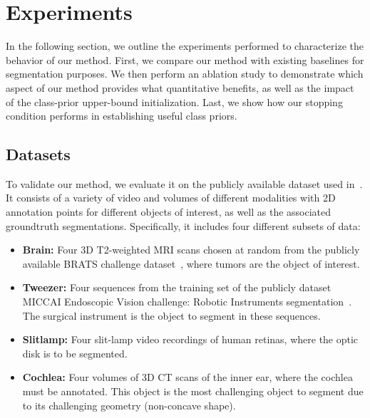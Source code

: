\section{Experiments}
\label{sec:exps}

In the following section, we outline the experiments performed to characterize the behavior of our method. First, we compare our method with existing baselines for segmentation purposes. We then perform an ablation study to demonstrate which aspect of our method provides what quantitative benefits, as well as the impact of the class-prior upper-bound initialization. Last, we show how our stopping condition performs in establishing useful class priors.

\subsection{Datasets}
To validate our method, we evaluate it on the publicly available dataset used in~\cite{lejeune18}. It consists of a variety of video and volumes of different modalities with 2D annotation points for different objects of interest, as well as the associated groundtruth segmentations. Specifically, it includes four different subsets of data:
\begin{itemize}
\item \textbf{Brain:} Four 3D T2-weighted MRI scans chosen at random from the publicly available BRATS challenge dataset~\cite{menze15}, where tumors are the object of interest.
\item \textbf{Tweezer:} Four sequences from the training set of the publicly dataset MICCAI Endoscopic Vision challenge: Robotic Instruments segmentation~\cite{endochal}. The surgical instrument is the object to segment in these sequences.
\item \textbf{Slitlamp:} Four slit-lamp video recordings of human retinas, where the optic disk is to be segmented.
\item \textbf{Cochlea:} Four volumes of 3D CT scans of the inner ear, where the cochlea must be annotated. This object is the most challenging object to segment due to its challenging geometry (\ie non-concave shape).
\end{itemize}


